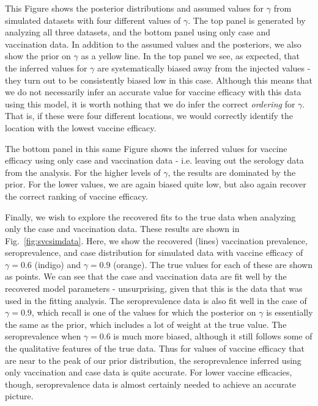 \documentclass[nofootinbib,aps,pre,twocolumn,superscriptaddress,showkeys,showpacs]{revtex4-1}
\begin{document}
This Figure shows the posterior distributions and assumed values for $\gamma$ from simulated datasets with four different values of $\gamma$. The top panel is generated by analyzing all three datasets, and the bottom panel using only case and vaccination data. In addition to the assumed values and the posteriors, we also show the prior on $\gamma$ as a yellow line. In the top panel we see, as expected, that the inferred values for $\gamma$ are systematically biased away from the injected values - they turn out to be consistently biased low in this case. Although this means that we do not necessarily infer an accurate value for vaccine efficacy with this data using this model, it is worth nothing that we do infer the correct \emph{ordering} for $\gamma$. That is, if these were four different locations, we would correctly identify the location with the lowest vaccine efficacy.

The bottom panel in this same Figure shows the inferred values for vaccine efficacy using only case and vaccination data - i.e. leaving out the serology data from the analysis. For the higher levels of $\gamma$, the results are dominated by the prior. For the lower values, we are again biased quite low, but also again recover the correct ranking of vaccine efficacy.

Finally, we wish to explore the recovered fits to the true data when analyzing only the case and vaccination data. These results are shown in Fig.~\ref{fig:svcsimdata}. Here, we show the recovered (lines) vaccination prevalence, seroprevalence, and case distribution for simulated data with vaccine efficacy of $\gamma = 0.6$ (indigo) and $\gamma = 0.9$ (orange). The true values for each of these are shown as points. We can see that the case and vaccination data are fit well by the recovered model parameters - unsurprising, given that this is the data that was used in the fitting analysis. The seroprevalence data is also fit well in the case of $\gamma = 0.9$, which recall is one of the values for which the posterior on $\gamma$ is essentially the same as the prior, which includes a lot of weight at the true value. The seroprevalence when $\gamma = 0.6$ is much more biased, although it still follows some of the qualitative features of the true data. Thus for values of vaccine efficacy that are near to the peak of our prior distribution, the seroprevalence inferred using only vaccination and case data is quite accurate. For lower vaccine efficacies, though, seroprevalence data is almost certainly needed to achieve an accurate picture.
\end{document}
